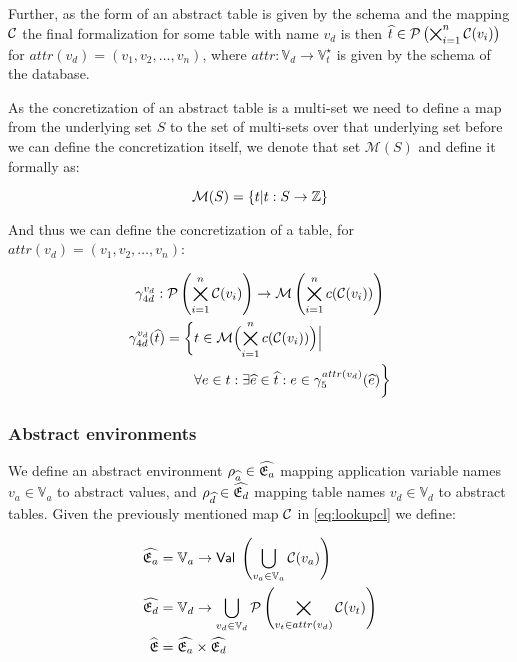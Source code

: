 Further, as the form of an abstract table is given by the schema and the mapping $\mathcal{C}$ the final formalization for some table with name $v_d$ is then $\widehat{t} \in \mathcal{P}\left(\bigtimes_{i = 1}^{n}\mathcal{C}(v_i)\right)$ for $attr(v_d) = (v_1, v_2, \dots, v_n)$, where $attr : \mathbb{V}_d \rightarrow \mathbb{V}_t^\star$ is given by the schema of the database.

As the concretization of an abstract table is a multi-set we need to define a map from the underlying set $S$ to the set of multi-sets over that underlying set before we can define the concretization itself, we denote that set $\mathcal{M}(S)$ and define it formally as:


\begin{equation}
    \mathcal{M}(S) = \{t | t : S \rightarrow \nums\}\label{eq:equation-nums}
\end{equation}


And thus we can define the concretization of a table, for $attr(v_d) = (v_1, v_2, \dots, v_n)$:


\begin{gather}
    \gamma^{v_d}_{4d} : \mathcal{P}\left(\bigtimes_{i = 1}^{n}\mathcal{C}(v_i)\right) \rightarrow \mathcal{M}\left(\bigtimes_{i = 1}^n c(\mathcal{C}(v_i))\right)\\
    \begin{split}
        \gamma^{v_d}_{4d}(\widehat{t}) = \biggl\{ &t \in \mathcal{M}\Bigl(\bigtimes_{i = 1}^n c(\mathcal{C}(v_i))\Bigr) \Big|\\
        &\forall e \in t : \exists \widehat{e} \in \widehat{t} : e \in \gamma^{attr(v_d)}_5(\widehat{e}) \biggr\}
    \end{split}
\end{gather}


\subsubsection{Abstract environments}
We define an abstract environment $\rho_{\widehat{a}} \in \widehat{\mathfrak{E}_a}$ mapping application variable names $v_a \in \mathbb{V}_a$ to abstract values, and $\rho_{\widehat{d}} \in \widehat{\mathfrak{E}_d}$ mapping table names $v_d \in \mathbb{V}_d$ to abstract tables.
Given the previously mentioned map $\mathcal{C}$ in \autoref{eq:lookupcl} we define:


\begin{align}
    \widehat{\mathfrak{E}_a} &= \mathbb{V}_a \rightarrow \mathsf{Val} \; \left( \bigcup_{v_a \in \mathbb{V}_a} \mathcal{C}(v_a) \right) \\
    \widehat{\mathfrak{E}_d} &= \mathbb{V}_d \rightarrow \bigcup_{v_d \in \mathbb{V}_d} \mathcal{P}\left(\bigtimes_{v_t \in attr(v_d)}\mathcal{C}(v_t)\right) \\
    \widehat{\mathfrak{E}} &= \widehat{\mathfrak{E}_a} \times \widehat{\mathfrak{E}_d}
\end{align}


